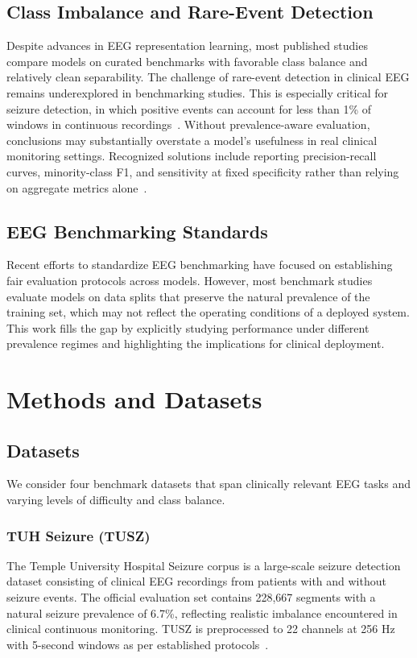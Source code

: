 \documentclass[journal]{IEEEtran}
\begin{document}
\subsection{Class Imbalance and Rare-Event Detection}

Despite advances in EEG representation learning, most published studies compare models on curated benchmarks with favorable class balance and relatively clean separability. The challenge of rare-event detection in clinical EEG remains underexplored in benchmarking studies. This is especially critical for seizure detection, in which positive events can account for less than 1\% of windows in continuous recordings~\cite{meier2017seizure}. Without prevalence-aware evaluation, conclusions may substantially overstate a model's usefulness in real clinical monitoring settings. Recognized solutions include reporting precision-recall curves, minority-class F1, and sensitivity at fixed specificity rather than relying on aggregate metrics alone~\cite{davis2006relationship,saito2015precision}.

\subsection{EEG Benchmarking Standards}

Recent efforts to standardize EEG benchmarking have focused on establishing fair evaluation protocols across models. However, most benchmark studies evaluate models on data splits that preserve the natural prevalence of the training set, which may not reflect the operating conditions of a deployed system. This work fills the gap by explicitly studying performance under different prevalence regimes and highlighting the implications for clinical deployment.

\section{Methods and Datasets}

\subsection{Datasets}

We consider four benchmark datasets that span clinically relevant EEG tasks and varying levels of difficulty and class balance.

\subsubsection{TUH Seizure (TUSZ)}
The Temple University Hospital Seizure corpus is a large-scale seizure detection dataset consisting of clinical EEG recordings from patients with and without seizure events. The official evaluation set contains 228,667 segments with a natural seizure prevalence of 6.7\%, reflecting realistic imbalance encountered in clinical continuous monitoring. TUSZ is preprocessed to 22 channels at 256 Hz with 5-second windows as per established protocols~\cite{obeid2016tuh}.
\end{document}
